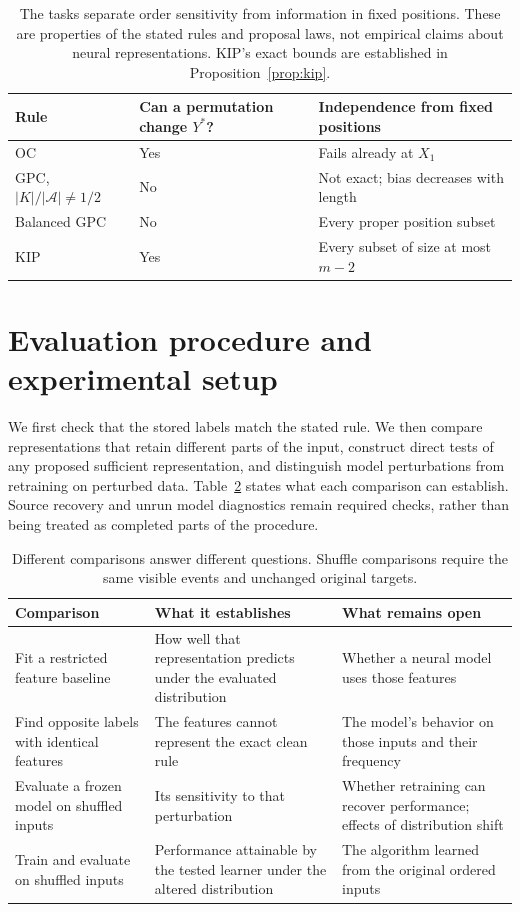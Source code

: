 \documentclass[10pt]{article}
\begin{document}
\begin{table}[H]
\centering\small
\caption{The tasks separate order sensitivity from information in fixed positions. These are properties of the stated rules and proposal laws, not empirical claims about neural representations. KIP's exact bounds are established in Proposition~\ref{prop:kip}.}
\label{tab:properties}
\begin{tabular}{@{}lll@{}}\toprule
Rule & Can a permutation change $Y^*$? & Independence from fixed positions \\\midrule
OC & Yes & Fails already at $X_1$ \\
GPC, $|K|/|\mathcal A|\ne 1/2$ & No & Not exact; bias decreases with length \\
Balanced GPC & No & Every proper position subset \\
KIP & Yes & Every subset of size at most $m-2$ \\
\bottomrule\end{tabular}
\end{table}

\section{Evaluation procedure and experimental setup}
\label{sec:setup}
We first check that the stored labels match the stated rule. We then compare representations that retain different parts of the input, construct direct tests of any proposed sufficient representation, and distinguish model perturbations from retraining on perturbed data. Table~\ref{tab:comparisons} states what each comparison can establish. Source recovery and unrun model diagnostics remain required checks, rather than being treated as completed parts of the procedure.

\begin{table}[H]
\centering\small
\caption{Different comparisons answer different questions. Shuffle comparisons require the same visible events and unchanged original targets.}
\label{tab:comparisons}
\begin{tabularx}{\linewidth}{@{}>{\raggedright\arraybackslash}p{.25\linewidth}>{\raggedright\arraybackslash}X>{\raggedright\arraybackslash}X@{}}\toprule
Comparison & What it establishes & What remains open \\\midrule
Fit a restricted feature baseline & How well that representation predicts under the evaluated distribution & Whether a neural model uses those features \\
Find opposite labels with identical features & The features cannot represent the exact clean rule & The model's behavior on those inputs and their frequency \\
Evaluate a frozen model on shuffled inputs & Its sensitivity to that perturbation & Whether retraining can recover performance; effects of distribution shift \\
Train and evaluate on shuffled inputs & Performance attainable by the tested learner under the altered distribution & The algorithm learned from the original ordered inputs \\
\bottomrule\end{tabularx}
\end{table}
\end{document}
